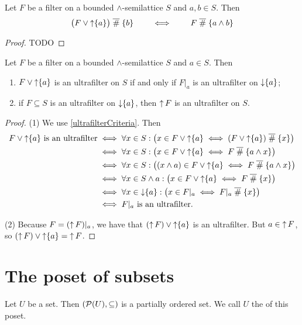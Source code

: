 \begin{proposition}
Let $F$ be a filter on a bounded $\wedge$-semilattice $S$ and $a,b\in S$. Then
\[ \big(F\vee \operatorname{\uparrow}\{a\}\big) \mathrel{\overline{\#}} \{b\} \qquad\iff\qquad F\mathrel{\overline{\#}}\{a\wedge b\} \]
\end{proposition}
\begin{proof}
TODO
\end{proof}
\begin{corollary} \label{traceUltrafilters}
Let $F$ be a filter on a bounded $\wedge$-semilattice $S$ and $a\in S$. Then
\begin{enumerate}
\item $F\vee \operatorname{\uparrow}\{a\}$ is an ultrafilter on $S$ \textup{if and only if} $F|_a$ is an ultrafilter on $\operatorname{\downarrow}\{a\}$;
\item if $F\subseteq S$ is an ultrafilter on $\operatorname{\downarrow}\{a\}$, then $\operatorname{\uparrow} F$ is an ultrafilter on $S$.
\end{enumerate}
\end{corollary}
\begin{proof}
(1) We use \ref{ultrafilterCriteria}. Then
\begin{align*}
\text{$F\vee \operatorname{\uparrow}\{a\}$ is an ultrafilter} &\iff \forall x\in S: \big( x\in F\vee \operatorname{\uparrow}\{a\} \iff (F\vee \operatorname{\uparrow}\{a\})\mathrel{\overline{\#}} \{x\} \big) \\
&\iff \forall x\in S: \big( x\in F\vee \operatorname{\uparrow}\{a\} \iff F\mathrel{\overline{\#}} \{a\wedge x\} \big) \\
&\iff \forall x\in S: \big( (x\wedge a)\in F\vee \operatorname{\uparrow}\{a\} \iff F\mathrel{\overline{\#}} \{a\wedge x\} \big) \\
&\iff \forall x\in S\wedge a: \big( x\in F\vee \operatorname{\uparrow}\{a\} \iff F\mathrel{\overline{\#}} \{x\} \big) \\
&\iff \forall x\in \operatorname{\downarrow}\{a\}: \big( x\in F|_a \iff F|_a\mathrel{\overline{\#}} \{x\} \big) \\
&\iff \text{$F|_a$ is an ultrafilter}.
\end{align*}

(2) Because $F = (\operatorname{\uparrow} F)|_a$, we have that $(\operatorname{\uparrow} F)\vee \operatorname{\uparrow}\{a\}$ is an ultrafilter. But $a\in \operatorname{\uparrow} F$, so $(\operatorname{\uparrow} F)\vee \operatorname{\uparrow}\{a\} = \operatorname{\uparrow} F$.
\end{proof}

\chapter{The poset of subsets}
\begin{definition}
Let $U$ be a set. Then $\left( \operatorname{\mathcal{P}}(U), \subseteq \right)$ is a partially ordered set. We call $U$ the  of this poset.
\end{definition}


